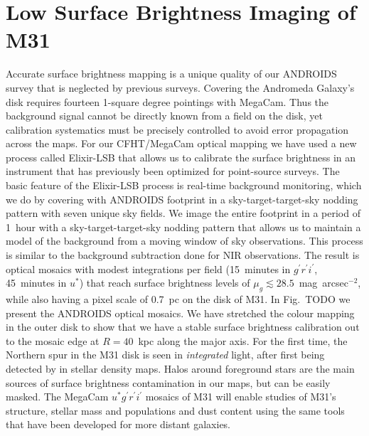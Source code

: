 \documentclass[11pt,twoside]{article}
\begin{document}
\section{Low Surface Brightness Imaging of M31}

Accurate surface brightness mapping is a unique quality of our ANDROIDS survey that is neglected by previous surveys.
Covering the Andromeda Galaxy's disk requires fourteen 1-square degree pointings with MegaCam.
Thus the background signal cannot be directly known from a field on the disk, yet calibration systematics must be precisely controlled to avoid error propagation across the maps.
For our CFHT/MegaCam optical mapping we have used a new process called Elixir-LSB that allows us to calibrate the surface brightness in an instrument that has previously been optimized for point-source surveys.
The basic feature of the Elixir-LSB process is real-time background monitoring, which we do by covering with ANDROIDS footprint in a sky-target-target-sky nodding pattern with seven unique sky fields.
We image the entire footprint in a period of 1~hour with a sky-target-target-sky nodding pattern that allows us to maintain a model of the background from a moving window of sky observations.
This process is similar to the background subtraction done for NIR observations.
The result is optical mosaics with modest integrations per field (15~minutes in $g^\prime r^\prime i^\prime$, 45~minutes in $u^*$) that reach surface brightness levels of $\mu_g \lesssim 28.5$~mag~arcsec$^{-2}$, while also having a pixel scale of 0.7~pc on the disk of M31.
In Fig.~TODO we present the ANDROIDS optical mosaics.
We have stretched the colour mapping in the outer disk to show that we have a stable surface brightness calibration out to the mosaic edge at $R=40$~kpc along the major axis.
For the first time, the Northern spur in the M31 disk is seen in \emph{integrated} light, after first being detected by \cite{Ferguson:2002} in stellar density maps.
Halos around foreground stars are the main sources of surface brightness contamination in our maps, but can be easily masked.
The MegaCam $u^*g^\prime r^\prime i^\prime$ mosaics of M31 will enable studies of M31's structure, stellar mass and populations and dust content using the same tools that have been developed for more distant galaxies.
\end{document}
